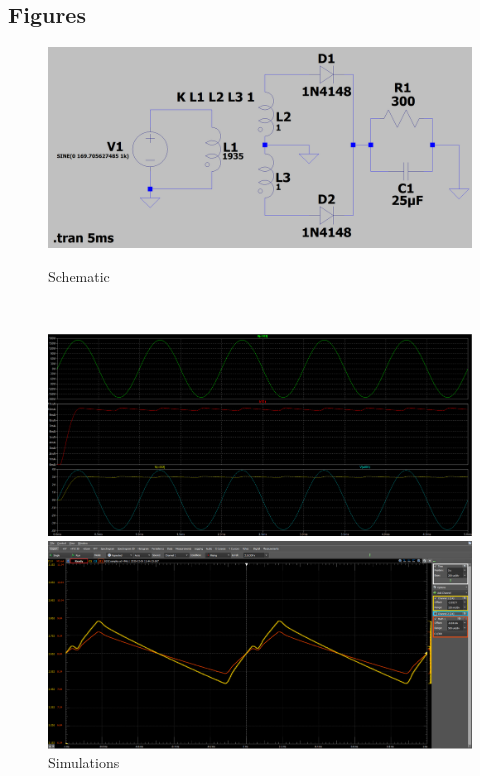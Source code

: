 \documentclass[12pt]{article}
\begin{document}
\begin{landscape}
    \pagestyle{lscapedplain}
    \appendix
    \section{Figures}
    \begin{figure}[ht!]
        \begin{minipage}[b]{0.5\linewidth}
            \centering
            \includegraphics[width=\linewidth]{images/Schematic.png} 
            \caption{Schematic} 
            \vspace{4ex}
        \end{minipage}%
        ~
        \begin{minipage}[b]{0.5\linewidth}
            \centering
            \includegraphics[width=\linewidth]{images/Simulations.png} 
            \caption{Simulations} 
            \vspace{4ex}
        \end{minipage}
        \begin{minipage}[b]{0.5\linewidth}
            \centering
            \includegraphics[width=\linewidth]{images/Measurements.png} 

\end{minipage}
\end{figure}
\end{landscape}
\end{document}

